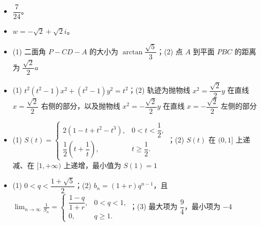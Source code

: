 \begin{itemize}[leftmargin=2.6em]
  \item[\textbf{21.}] $\dfrac7{24}$。
  \item[\textbf{22.}] $w=-\sqrt2+\sqrt2i$。
  \item[\textbf{23.}] (1) 二面角 $P-CD-A$ 的大小为 $\arctan\dfrac{\sqrt5}{3}$；(2) 点 $A$ 到平面 $PBC$ 的距离为 $\dfrac{\sqrt2}{2}a$
  \item[\textbf{24.}] (1) $t^2(t^2-1)x^2+(t^2-1)y^2=t^2$；(2) 轨迹为抛物线 $x^2=\dfrac{\sqrt2}{2}y$ 在直线 $x=\dfrac{\sqrt2}{2}$ 右侧的部分，以及抛物线 $x^2=-\dfrac{\sqrt2}{2}y$ 在直线 $x=-\dfrac{\sqrt2}{2}$ 左侧的部分
  \item[\textbf{25.}] (1) $S(t)=\begin{cases}2(1-t+t^2-t^3),&0<t<\dfrac12,\\[3pt]\dfrac12\left(t+\dfrac1t\right),&t\ge\dfrac12.\end{cases}$；(2) $S(t)$ 在 $(0,1]$ 上递减、在 $[1,+\infty)$ 上递增，最小值为 $S(1)=1$
  \item[\textbf{26.}] (1) $0<q<\dfrac{1+\sqrt5}{2}$；(2) $b_n=(1+r)q^{n-1}$，且 $\displaystyle\lim_{n\to\infty}\frac1{S_n}=\begin{cases}\dfrac{1-q}{1+r},&0<q<1,\\[3pt]0,&q\ge1.\end{cases}$；(3) 最大项为 $\dfrac94$，最小项为 $-4$
\end{itemize}
